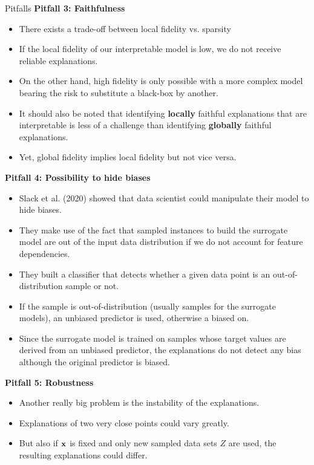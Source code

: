 \documentclass[11pt,compress,t,notes=noshow, xcolor=table]{beamer}
\begin{document}
\begin{vbframe}{Pitfalls}
\textbf{Pitfall 3: Faithfulness}
\begin{itemize}
	\item There exists a trade-off between local fidelity vs. sparsity 
	\item If the local fidelity of our interpretable model is low, we do not receive reliable explanations.
	\item On the other hand, high fidelity is only possible with a more complex model bearing the risk to substitute a black-box by another.
	\item It should also be noted that identifying \textbf{locally} faithful explanations that are interpretable is less of a challenge than identifying \textbf{globally} faithful explanations. 
	\item Yet, global fidelity implies local fidelity but not vice versa. 
\end{itemize}

\textbf{Pitfall 4: Possibility to hide biases}
\begin{itemize}
	\item Slack et al. (2020) showed that data scientist could manipulate their model to hide biases. 
	\item They make use of the fact that sampled instances to build the surrogate model are out of the input data distribution if we do not account for feature dependencies. 
	\item They built a classifier that detects whether a given data point is an out-of-distribution sample or not. 
	\item If the sample is out-of-distribution (usually samples for the surrogate models), an unbiased predictor is used, otherwise a biased on. 
	\item Since the surrogate model is trained on samples whose target values are derived from an unbiased predictor, the explanations do not detect any bias although the original predictor is biased. 
\end{itemize}

\textbf{Pitfall 5: Robustness}
\begin{itemize}
	\item Another really big problem is the instability of the explanations. 
	\item Explanations of two very close points could vary greatly. 
	\item But also if $\xv$ is fixed and only new sampled data sets $Z$ are used, the resulting explanations could differ.  
\end{itemize}


\end{vbframe}
\end{document}
